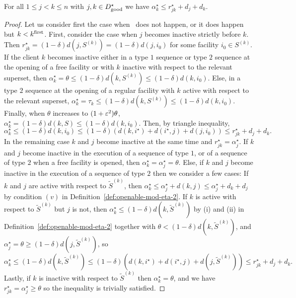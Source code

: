 \begin{lemma}
\label{lem:fr-triangle-robust}
    For all $1 \le j < k \le n$ with $j, k \in D^\star_{\mathrm{good}}$ we have $\alpha^\star_k \le r^\star_{jk} + d_j + d_k$.
\end{lemma}
\begin{proof}
    Let us consider first the case when \specialevent\ does not happen, or it does happen but $k < k^{\mathrm{first}}$.
    First, consider the case when $j$ becomes inactive strictly before $k$.
    Then $r^\star_{jk} = (1-\delta)d(j,S^{(k)}) = (1-\delta)d(j,i_0)$ for some facility $i_0 \in S^{(k)}$.
    If the client $k$ becomes inactive either in a type $1$ sequence or type $2$ sequence at the opening of a free facility or with $k$ inactive with respect to the relevant superset, then $\alpha_k^\star = \theta \leq (1-\delta) d(k,S^{(k)}) \leq (1-\delta)d(k, i_0)$.
    Else, in a type $2$ sequence at the opening of a regular facility with $k$ active with respect to the relevant superset, $\alpha_k^\star = \tau_k \leq (1-\delta)d(k,S^{(k)}) \leq (1-\delta) d(k, i_0)$.
    Finally, when $\theta$ increases to $(1+\varepsilon^2)\theta$, $\alpha_k^\star = (1-\delta)d(k,S) \leq (1-\delta) d(k, i_0)$.
    Then, by triangle inequality,
    \[
        \alpha^\star_k \le (1-\delta)d(k,i_0) \le (1-\delta)(d(k, i^\star) + d(i^\star, j) + d(j, i_0)) \le r^\star_{jk} + d_j + d_k.
    \]
    In the remaining case $k$ and $j$ become inactive at the same time and $r^\star_{jk} = \alpha^\star_j$.
    If $k$ and $j$ become inactive in the execution of a sequence of type $1$, or of a sequence of type $2$ when a free facility is opened, then $\alpha^\star_k = \alpha^\star_j = \theta$.
    Else, if $k$ and $j$ become inactive in the execution of a sequence of type $2$ then we consider a few cases: If $k$ and $j$ are active with respect to $\tilde{S}^{(k)}$, then $\alpha^\star_k \le \alpha^\star_j + d(k,j) \le \alpha^\star_j + d_k + d_j$ by condition $(v)$ in Definition~\ref{def:openable-mod-eta-2}.
    If $k$ is active with respect to $\tilde{S}^{(k)}$ but $j$ is not, then $\alpha_k^\star \leq (1-\delta)d(k, \tilde{S}^{(k)})$ by (i) and (ii) in Definition~\ref{def:openable-mod-eta-2} together with $\theta < (1-\delta)d(k, \tilde{S}^{(k)})$, and $\alpha_j^\star = \theta \geq (1-\delta)d(j, \tilde{S}^{(k)})$, so
    \[
        \alpha^\star_k \le (1-\delta)d(k,\tilde S^{(k)}) \le (1-\delta)(d(k, i^\star) + d(i^\star, j) + d(j, \tilde S^{(k)})) \le r^\star_{jk} + d_j + d_k.
    \]
    Lastly, if $k$ is inactive with respect to $\tilde{S}^{(k)}$ then $\alpha^\star_k = \theta$, and we have $r^\star_{jk} = \alpha^\star_j \geq \theta$ so the inequality is trivially satisfied.
    

\end{proof}
